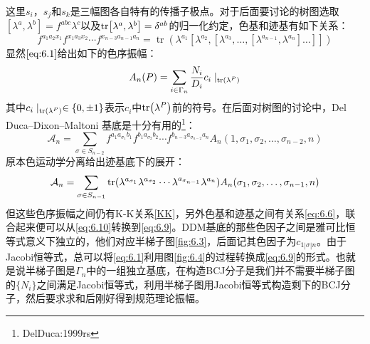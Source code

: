 这里$s_i$，$s_j$和$s_k$是三幅图各自特有的传播子极点。对于后面要讨论的树图选取$[\lambda^a,\lambda^b] = f^{abc}\lambda^c$以及$\tr [\lambda^a,\lambda^b]=\delta^{ab}$的归一化约定，色基和迹基有如下关系：
\begin{equation}
	\label{eq:6.6}
	f^{a_1a_2x_1}f^{x_1a_3x_2}\cdots f^{x_{n-3}a_{n-1}a_n}=\operatorname{tr}\left(\lambda^{a_1}\left[\lambda^{a_2},[\lambda^{a_3},\ldots,[\lambda^{a_{n-1}},\lambda^{a_n}]\ldots]\right]\right)
\end{equation}
显然$\ref{eq:6.1}$给出如下的色序振幅：
\begin{equation}
	A_n(P)=\sum_{i\in\Gamma_n}\frac{N_i}{D_i}c_i\mid_{\tr (\lambda^P)}
\end{equation}
其中$c_i\mid_{\tr (\lambda^P)}\in\{0,\pm1\}$表示$c_i$中$\tr (\lambda^P)$前的符号。在后面对树图的讨论中，Del Duca–Dixon–Maltoni 基底是十分有用的\footnote{DelDuca:1999rs}：
\begin{equation}
	\label{eq:6.9}
	\mathcal{A}_n = \sum_{\sigma \in S_{n-2}} f^{a_1 a_{\sigma_1} b_1} f^{b_1 a_{\sigma_2} b_2} \cdots f^{b_{n-3} a_{\sigma_{n-2}} a_n} A_n(1, \sigma_1, \sigma_2, \ldots, \sigma_{n-2}, n)
\end{equation}
原本色运动学分离给出迹基底下的展开：
\begin{equation}
	\label{eq:6.10}
	\mathcal{A}_n=\sum_{\sigma\in S_{n-1}}\tr (\lambda^{a_{\sigma_1}}\lambda^{a_{\sigma_2}}\cdots \lambda^{a_{\sigma_{n-1}}}\lambda^{a_n})A_n(\sigma_1,\sigma_2,\ldots,\sigma_{n-1},n)
\end{equation}
但这些色序振幅之间仍有K-K关系\ref{KK}，另外色基和迹基之间有关系\ref{eq:6.6}，联合起来便可以从\ref{eq:6.10}转换到\ref{eq:6.9}。DDM基底的那些色因子之间是雅可比恒等式意义下独立的，他们对应半梯子图\ref{fig:6.3}，后面记其色因子为$c_{1|\sigma|n}$。由于Jacobi恒等式，总可以将\ref{eq:6.1}利用图\ref{fig:6.4}的过程转换成\ref{eq:6.9}的形式。也就是说半梯子图是$\Gamma_n$中的一组独立基底，在构造BCJ分子是我们并不需要半梯子图的$\{N_i\}$之间满足Jacobi恒等式，利用半梯子图用Jacobi恒等式构造剩下的BCJ分子，然后要求求和后刚好得到规范理论振幅。
